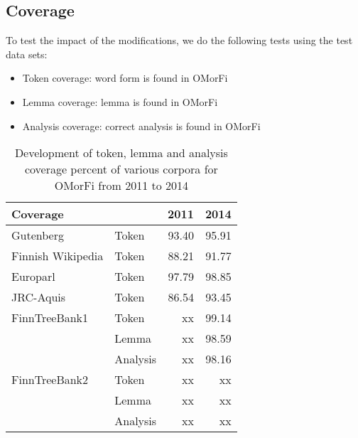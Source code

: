 \documentclass[11pt]{article}
\begin{document}
\subsection{Coverage}

To test the impact of the modifications, we do the following tests using the
test data sets:

\begin{itemize}
\item Token coverage: word form is found in OMorFi
\item Lemma coverage: lemma is found in OMorFi
\item Analysis coverage: correct analysis is found in OMorFi
\end{itemize}

\begin{table}[h]
    \begin{center}
        \begin{tabular}{|ll|rr|}
            \hline
            \bf Coverage            &                & \bf 2011 & \bf 2014 \\
            \hline
            \sc Gutenberg           & Token     & 93.40           & 95.91 \\
            \sc Finnish Wikipedia & Token     & 88.21           & 91.77 \\
            \sc Europarl               & Token     & 97.79          & 98.85 \\
            \sc JRC-Aquis            & Token     & 86.54          & 93.45 \\
            \hline
             \sc FinnTreeBank1    & Token     & xx          & 99.14 \\
            \sc                             & Lemma   & xx          & 98.59 \\
            \sc                             & Analysis & xx          & 98.16 \\
            \hline
             \sc FinnTreeBank2     & Token     & xx          & xx \\
            \sc                              & Lemma   & xx          & xx \\
            \sc                               & Analysis & xx          & xx \\
            \hline
        \end{tabular}
    \end{center}
    \caption{Development of token, lemma and analysis coverage percent of various corpora for OMorFi from 2011 to 2014}
\end{table}
\end{document}
